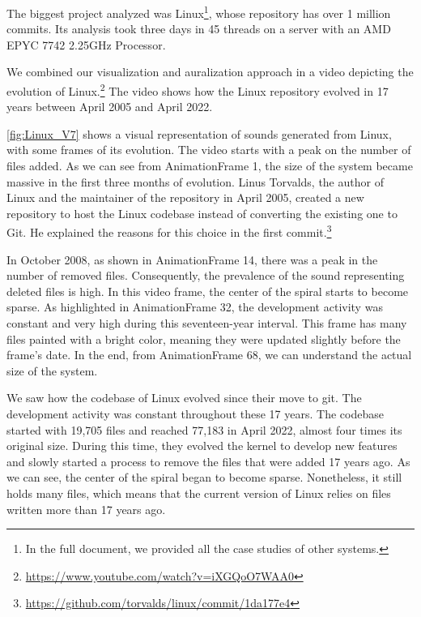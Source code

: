 \documentclass[11pt,twoside,english,singlespacing,headsepline,consistentlayout]{auxiliary/si-msc-thesis}
\begin{document}
The biggest project analyzed was Linux\footnote{In the full document, we provided all the case studies of other systems.}, whose repository has over 1 million commits. Its analysis took three days in 45 threads on a server with an AMD EPYC 7742 2.25GHz Processor. 

We combined our visualization and auralization approach in a video depicting the evolution of Linux.\footnote{\url{https://www.youtube.com/watch?v=iXGQoO7WAA0}} The video shows how the Linux repository evolved in 17 years between April 2005 and April 2022. 

\autoref{fig:Linux_V7} shows a visual representation of sounds generated from Linux, with some frames of its evolution. The video starts with a peak on the number of files added. As we can see from AnimationFrame 1, the size of the system became massive in the first three months of evolution. Linus Torvalds, the author of Linux and the maintainer of the repository in April 2005, created a new repository to host the Linux codebase instead of converting the existing one to Git. He explained the reasons for this choice in the first commit.\footnote{\url{https://github.com/torvalds/linux/commit/1da177e4}}

In October 2008, as shown in AnimationFrame 14, there was a peak in the number of removed files. Consequently, the prevalence of the sound representing deleted files is high. In this video frame, the center of the spiral starts to become sparse. As highlighted in AnimationFrame 32, the development activity was constant and very high during this 
seventeen-year interval. This frame has many files painted with a bright color, meaning they were updated slightly before the frame's date. 
In the end, from AnimationFrame 68, we can understand the actual size of the system.

 We saw how the codebase of Linux evolved since their move to git. The development activity was constant throughout these 17 years. The codebase started with 19,705 files and reached 77,183 in April 2022, almost four times its original size. During this time, they evolved the kernel to develop new features and slowly started a process to remove the files that were added 17 years ago. As we can see, the center of the spiral began to become sparse. Nonetheless, it still holds many files, which means that the current version of Linux relies on files written more than 17 years ago. 
\end{document}
